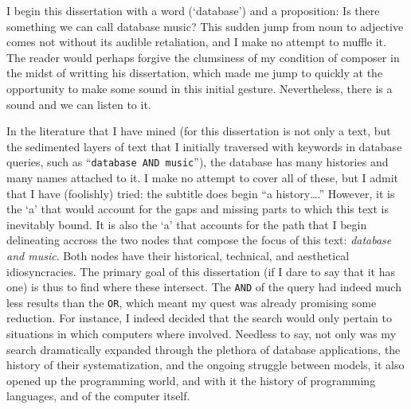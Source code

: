 I begin this dissertation with a word (`database') and a proposition: Is there something we can call database music? This sudden jump from noun to adjective comes not without its audible retaliation, and I make no attempt to muffle it. The reader would perhaps forgive the clumsiness of my condition of composer in the midst of writting his dissertation, which made me jump to quickly at the opportunity to make some sound in this initial gesture. Nevertheless, there is a sound and we can listen to it.

In the literature that I have mined (for this dissertation is not only a text, but the sedimented layers of text that I initially traversed with keywords in database queries, such as ``\texttt{database AND music}''), the database has many histories and many names attached to it. I make no attempt to cover all of these, but I admit that I have (foolishly) tried: the subtitle does begin ``a history\dots.'' However, it is the `a' that would account for the gaps and missing parts to which this text is inevitably bound. It is also the `a' that accounts for the path that I begin delineating accross the two nodes that compose the focus of this text: \textit{database and music}. Both nodes have their historical, technical, and aesthetical idiosyncracies. The primary goal of this dissertation (if I dare to say that it has one) is thus to find where these intersect. The \texttt{AND} of the query had indeed much less results than the \texttt{OR}, which meant my quest was already promising some reduction. For instance, I indeed decided that the search would only pertain to situations in which computers where involved. Needless to say, not only was my search dramatically expanded through the plethora of database applications, the history of their systematization, and the ongoing struggle between models, it also opened up the programming world, and with it the history of programming languages, and of the computer itself. 

